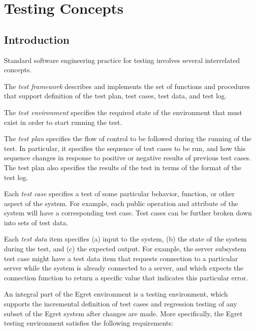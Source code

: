 \chapter{Testing Concepts}
\section{Introduction}

Standard software engineering practice for testing involves several
interrelated concepts.

The {\em test framework}\/ describes and implements the set of
functions and procedures that support definition of the test plan,
test cases, test data, and test log.

The {\em test environment}\/ specifies the required state of the
environment that must exist in order to start running the test.

The {\em test plan}\/ specifies the flow of control to be followed
during the running of the test. In particular, it specifies the
sequence of test cases to be run, and how this sequence changes in
response to positive or negative results of previous test cases.  The
test plan also specifies the results of the test in terms of the
format of the test log.

Each {\em test case}\/ specifies a test of some particular behavior,
function, or other aspect of the system.  For example, each public
operation and attribute of the system will have a corresponding test
case.  Test cases can be further broken down into sets of test data.

Each {\em test data}\/ item specifies (a) input to the system, (b) the
state of the system during the test, and (c) the expected output.  For
example, the server subsystem test case might have a test data item
that requests connection to a particular server while the system is
already connected to a server, and which expects the connection
function to return a specific value that indicates this particular
error.

An integral part of the Egret environment is a testing environment,
which supports the incremental definition of test cases and 
regression testing of any subset of the Egret system after changes
are made.  More specifically, the Egret testing environment 
satisfies the following requirements:

